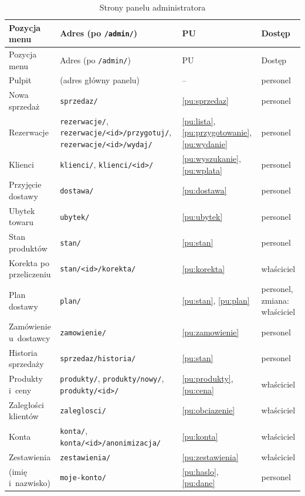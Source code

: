 \documentclass[12pt,a4paper,oneside]{article}
\newcounter{pu}
\begin{document}
\begin{longtable}{@{}L{3.5cm}L{5.4cm}L{3.6cm}L{2.2cm}@{}}
	\caption{Strony panelu administratora}
	\label{tab:strony-admina}\\
	\toprule
	Pozycja menu & Adres (po \texttt{/admin/}) & PU & Dostęp \\
	\midrule
	\endfirsthead
	\toprule
	Pozycja menu & Adres (po \texttt{/admin/}) & PU & Dostęp \\
	\midrule
	\endhead
	Pulpit & (adres główny panelu) & -- & personel \\
	Nowa sprzedaż & \texttt{sprzedaz/} & \ref{pu:sprzedaz} & personel \\
	Rezerwacje & \texttt{rezerwacje/}, \texttt{rezerwacje/<id>/\allowbreak{}przygotuj/}, \texttt{rezerwacje/<id>/wydaj/} & \ref{pu:lista}, \ref{pu:przygotowanie}, \ref{pu:wydanie} & personel \\
	Klienci & \texttt{klienci/}, \texttt{klienci/<id>/} & \ref{pu:wyszukanie}, \ref{pu:wplata} & personel \\
	Przyjęcie dostawy & \texttt{dostawa/} & \ref{pu:dostawa} & personel \\
	Ubytek towaru & \texttt{ubytek/} & \ref{pu:ubytek} & personel \\
	Stan produktów & \texttt{stan/} & \ref{pu:stan} & personel \\
	Korekta po przeliczeniu & \texttt{stan/<id>/korekta/} & \ref{pu:korekta} & właściciel \\
	Plan dostawy & \texttt{plan/} & \ref{pu:stan}, \ref{pu:plan} & personel, zmiana: właściciel \\
	Zamówienie u~dostawcy & \texttt{zamowienie/} & \ref{pu:zamowienie} & personel \\
	Historia sprzedaży & \texttt{sprzedaz/historia/} & \ref{pu:stan} & personel \\
	Produkty i~ceny & \texttt{produkty/}, \texttt{produkty/nowy/}, \texttt{produkty/<id>/} & \ref{pu:produkty}, \ref{pu:cena} & właściciel \\
	Zaległości klientów & \texttt{zaleglosci/} & \ref{pu:obciazenie} & właściciel \\
	Konta & \texttt{konta/}, \texttt{konta/<id>/\allowbreak{}anonimizacja/} & \ref{pu:konta} & właściciel \\
	Zestawienia & \texttt{zestawienia/} & \ref{pu:zestawienia} & właściciel \\
	(imię i~nazwisko) & \texttt{moje-konto/} & \ref{pu:haslo}, \ref{pu:dane} & personel \\
	\bottomrule
\end{longtable}
\end{document}
